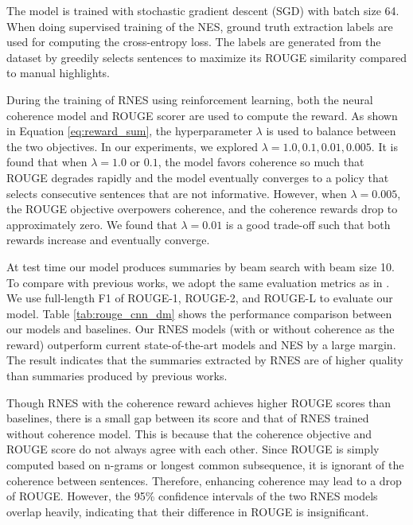 	The model is trained with stochastic gradient descent (SGD) with batch size 64. When doing supervised training of the NES, ground truth extraction labels are used for computing the cross-entropy loss. The labels are generated from the dataset by greedily selects sentences to maximize its ROUGE similarity compared to manual highlights.

	During the training of RNES using reinforcement learning, both the neural coherence model and ROUGE scorer are used to compute the reward. As shown in Equation \ref{eq:reward_sum}, the hyperparameter $\lambda$ is used to balance between the two objectives. In our experiments, we explored $\lambda=1.0, 0.1, 0.01, 0.005$. It is found that when $\lambda=1.0$ or $0.1$, the model favors coherence so much that ROUGE degrades rapidly and the model eventually converges to a policy that selects consecutive sentences that are not informative. However, when $\lambda = 0.005$, the ROUGE objective overpowers coherence, and the coherence rewards drop to approximately zero. We found that $\lambda=0.01$ is a good trade-off such that both rewards increase and eventually converge.

	At test time our model produces summaries by beam search with beam size 10. To compare with previous works, we adopt the same evaluation metrics as in \cite{SummaRuNNer}. We use full-length F1 of ROUGE-1, ROUGE-2, and ROUGE-L to evaluate our model. Table \ref{tab:rouge_cnn_dm} shows the performance comparison between our models and baselines. Our RNES models (with or without coherence as the reward) outperform current state-of-the-art models and NES by a large margin. The result indicates that the summaries extracted by RNES are of higher quality than summaries produced by previous works.

	Though RNES with the coherence reward achieves higher ROUGE scores than baselines, there is a small gap between its score and that of RNES trained without coherence model. This is because that the coherence objective and ROUGE score do not always agree with each other. Since ROUGE is simply computed based on n-grams or longest common subsequence, it is ignorant of the coherence between sentences. Therefore, enhancing coherence may lead to a drop of ROUGE. However, the 95\% confidence intervals of the two RNES models overlap heavily, indicating that their difference in ROUGE is insignificant.

